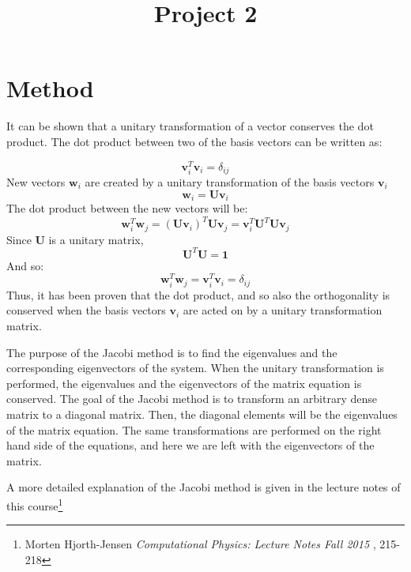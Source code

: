 \documentclass[12pt]{article}
\begin{document}
\title{Project 2}
\maketitle
\section{Method}



It can be shown that a unitary transformation of a vector conserves the dot product. 
The dot product between two of the basis vectors can be written as:

\begin{equation*}
\mathbf{v}_i^T \mathbf{v}_i=  \delta_{ij}
\end{equation*}
New vectors $\mathbf{w}_i$ are created by a unitary transformation of the basis vectors $\mathbf{v}_i$ 
\begin{equation*}
\mathbf{w}_i = \mathbf{Uv}_i
\end{equation*}
The dot product between the new vectors will be:
\begin{equation*}
\mathbf{w}_i^T\mathbf{w}_j  = (\mathbf{U}\mathbf{v}_i)^T\mathbf{U}\mathbf{v}_j = \mathbf{v}_i^T\mathbf{U}^T\mathbf{U}\mathbf{v}_j
\end{equation*}
Since $\mathbf{U}$ is a unitary matrix, 
\begin{equation*}
\mathbf{U}^T\mathbf{U} = \mathbf{1}
\end{equation*}
And so:
\begin{equation*}
\mathbf{w}_i^T\mathbf{w}_j  = \mathbf{v}_i^T \mathbf{v}_i=  \delta_{ij}
\end{equation*}
Thus, it has been proven that the dot product, and so also the orthogonality is conserved when the basis vectors $\mathbf{v}_i$ are acted on by a unitary transformation matrix. 



The purpose of the Jacobi method is to find the eigenvalues and the corresponding eigenvectors of the system. When the unitary transformation is performed, the eigenvalues and the eigenvectors of the matrix equation is conserved. The goal of the Jacobi method is to transform an arbitrary dense matrix to a diagonal matrix. Then, the diagonal elements will be the eigenvalues of the matrix equation. The same transformations are performed on the right hand side of the equations, and here we are left with the eigenvectors of the matrix.

 A more detailed explanation of the Jacobi method  is given in the lecture notes of this course\footnote{Morten Hjorth-Jensen \textit{Computational Physics: Lecture Notes Fall 2015 }, 215-218} 
\end{document}
